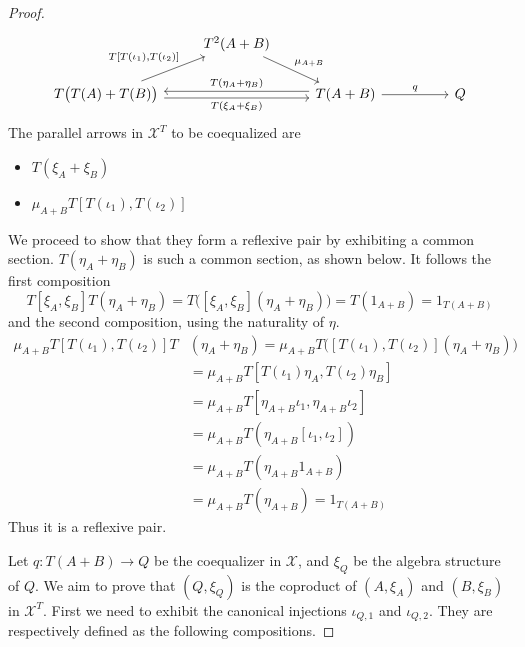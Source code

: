 \begin{subbox}{}
\begin{proof}
\[\begin{tikzcd}
                                                                                                                                                    & T^2(A+B) \arrow[rd, "\mu_{A+B}"]                                &                                                                                                     &  &                           \\
T\bigl( T(A)+T(B)\bigr) \arrow[rr, "{T(\xi_A+\xi_B)}"', shift right] \arrow[ru, "{T[T(\iota_1),T(\iota_2)]}", pos=0.65]                                       &                                                                 & T(A+B) \arrow[ll, "T(\eta_A+\eta_B)"', shift right] \arrow[rr, "q"]                      &  & Q                        
\end{tikzcd}
\]
        The parallel arrows in $\mathcal{X}^T$ to be coequalized are
        \begin{itemize}
            \item $T(\xi_A+\xi_B)$
            \item $\mu_{A+B}T[T(\iota_1),T(\iota_2)]$
        \end{itemize}
        We proceed to show that they form a reflexive pair by exhibiting a common section. $T(\eta_A+\eta_B)$ is such a common section, as shown below. It follows the first composition
        \[T[\xi_A,\xi_B]T(\eta_A+\eta_B)=T\bigl([\xi_A,\xi_B](\eta_A+\eta_B)\bigr)=T(1_{A+B})=1_{T(A+B)} \]
        and the second composition, using the naturality of $\eta$.
        \begin{align*}
        \mu_{A+B}T[T(\iota_1),T(\iota_2)]T&(\eta_A+\eta_B)=\mu_{A+B}T\bigl([T(\iota_1),T(\iota_2)](\eta_A+\eta_B)\bigr) \\[1.5ex]
        &= \mu_{A+B}T[T(\iota_1)\eta_A,T(\iota_2)\eta_B] \\[1.5ex]
        &= \mu_{A+B}T[\eta_{A+B}\iota_1,\eta_{A+B}\iota_2] \\[1.5ex]
        &= \mu_{A+B}T(\eta_{A+B} [\iota_1,\iota_2]) \\[1.5ex]
        &= \mu_{A+B}T(\eta_{A+B} 1_{A+B}) \\[1.5ex]
        &= \mu_{A+B}T(\eta_{A+B}) = 1_{T(A+B)}
        \end{align*}
        Thus it is a reflexive pair. 
        
        Let $q:T(A+B) \to Q$ be the coequalizer in $\mathcal{X}$, and $\xi_Q$ be the algebra structure of $Q$. We aim to prove that $(Q,\xi_Q)$ is the coproduct of $(A,\xi_A)$ and $(B,\xi_B)$ in $\mathcal{X}^T$. First we need to exhibit the canonical injections $\iota_{Q,1}$ and $\iota_{Q,2}$. They are respectively defined as the following compositions.
        

\end{proof}
\end{subbox}
